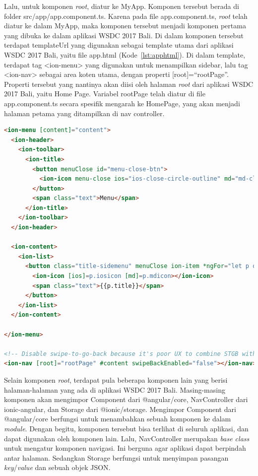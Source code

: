 Lalu, untuk komponen \textit{root}, diatur ke MyApp. Komponen tersebut berada di folder src/app/app.component.ts. Karena pada file app.component.ts, \textit{root} telah diatur ke dalam MyApp, maka komponen tersebut menjadi komponen pertama yang dibuka ke dalam aplikasi WSDC 2017 Bali. Di dalam komponen tersebut terdapat templateUrl yang digunakan sebagai template utama dari aplikasi WSDC 2017 Bali, yaitu file app.html (Kode~\ref{lst:apphtml}). Di dalam template, terdapat tag <ion-menu> yang digunakan untuk menampilkan sidebar, lalu tag <ion-nav> sebagai area koten utama, dengan properti [root]=``rootPage''. Properti tersebut yang nantinya akan diisi oleh halaman \textit{root} dari aplikasi WSDC 2017 Bali, yaitu Home Page. Variabel rootPage telah diatur di file app.component.ts secara spesifik mengarah ke HomePage, yang akan menjadi halaman petama yang ditampilkan di nav controller. 

\newpage

\begin{lstlisting}[language=html, label={lst:apphtml}, caption=\textit{Source Code} File app.html]
<ion-menu [content]="content">
  <ion-header>
    <ion-toolbar>
      <ion-title>
        <button menuClose id="menu-close-btn">
          <ion-icon menu-close ios="ios-close-circle-outline" md="md-close-circle"></ion-icon>
        </button>
        <span class="text">Menu</span>
      </ion-title>
    </ion-toolbar>
  </ion-header>

  <ion-content>
    <ion-list>
      <button class="title-sidemenu" menuClose ion-item *ngFor="let p of pages" (click)="openPage(p)">
        <ion-icon [ios]=p.iosicon [md]=p.mdicon></ion-icon>
        <span class="text">{{p.title}}</span>
      </button>
    </ion-list>
  </ion-content>

</ion-menu>

<!-- Disable swipe-to-go-back because it's poor UX to combine STGB with side menus -->
<ion-nav [root]="rootPage" #content swipeBackEnabled="false"></ion-nav>

\end{lstlisting} 

Selain komponen \textit{root}, terdapat pula beberapa komponen lain yang berisi halaman-halaman yang ada di aplikasi WSDC 2017 Bali. Masing-masing komponen akan mengimpor Component dari @angular/core, NavController dari ionic-angular, dan Storage dari @ionic/storage. Mengimpor Component dari @angular/core berfungsi untuk menambahkan sebuah komponen ke dalam \textit{module}. Dengan begitu, komponen tersebut bisa terlihat di seluruh aplikasi, dan dapat digunakan oleh komponen lain. Lalu, NavController merupakan \textit{base class} untuk mengatur komponen navigasi. Ini berguna agar aplikasi dapat berpindah antar halaman. Sedangkan Storage berfungsi untuk menyimpan pasangan \textit{key}/\textit{value} dan sebuah objek JSON.

